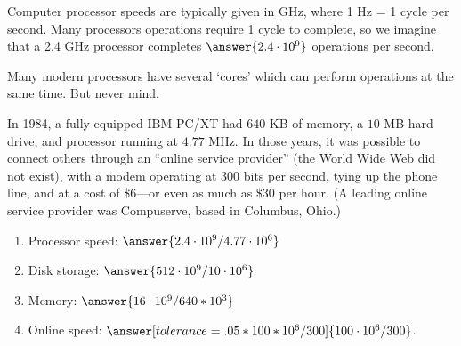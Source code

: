 \documentclass[nooutcomes]{ximera}
\begin{document}
\begin{problem}
Computer processor speeds are typically given in GHz, where 1 Hz = 1 cycle per second.  Many processors operations require 1 cycle to complete, so we imagine that a 2.4 GHz processor completes $\answer{2.4\cdot10^9}$ operations per second.  

Many modern processors have several `cores' which can perform operations at the same time.  But never mind.  

In 1984, a fully-equipped IBM PC/XT had $640$ KB of memory, a $10$ MB hard drive, and processor running at $4.77$ MHz.  In those years, it was possible to connect others through an ``online service provider'' (the World Wide Web did not exist), with a modem operating at 300 bits per second, tying up the phone line, and at a cost of $\$6$---or even as much as $\$30$ per hour.  (A leading online service provider was Compuserve, based in Columbus, Ohio.)  

\begin{enumerate}
\item Processor speed: $\answer{2.4\cdot10^9/4.77\cdot10^6}$
\item Disk storage: $\answer{512\cdot10^9/10\cdot10^6}$
\item Memory: $\answer{16\cdot10^9/640*10^3}$
\item Online speed: $\answer[tolerance=.05*100*10^6/300]{100\cdot10^6/300}$. 
\end{enumerate}
\end{problem}
\end{document}
